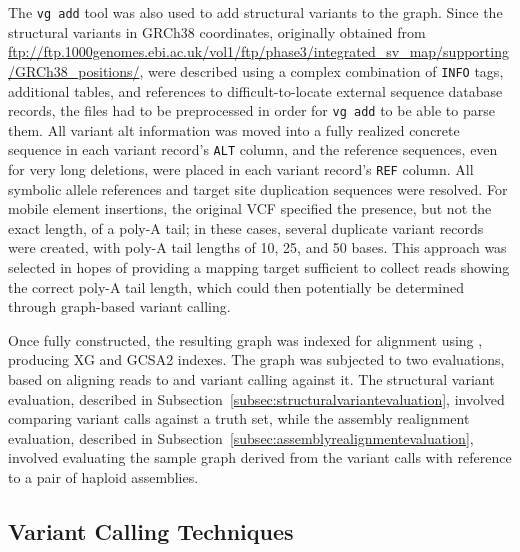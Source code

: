 \begin{sloppypar}
The \texttt{vg add} tool was also used to add structural variants to the graph. Since the structural variants in GRCh38 coordinates, originally obtained from \url{ftp://ftp.1000genomes.ebi.ac.uk/vol1/ftp/phase3/integrated_sv_map/supporting/GRCh38_positions/}, were described using a complex combination of \texttt{INFO} tags, additional tables, and references to difficult-to-locate external sequence database records, the files had to be preprocessed in order for \texttt{vg add} to be able to parse them. All variant alt information was moved into a fully realized concrete sequence in each variant record's \texttt{ALT} column, and the reference sequences, even for very long deletions, were placed in each variant record's \texttt{REF} column. All symbolic allele references and target site duplication sequences were resolved. For mobile element insertions, the original VCF specified the presence, but not the exact length, of a poly-A tail; in these cases, several duplicate variant records were created, with poly-A tail lengths of 10, 25, and 50 bases. This approach was selected in hopes of providing a mapping target sufficient to collect reads showing the correct poly-A tail length, which could then potentially be determined through graph-based variant calling.
\end{sloppypar}

Once fully constructed, the resulting graph was indexed for alignment using \vg, producing XG and GCSA2 indexes. The graph was subjected to two evaluations, based on aligning reads to and variant calling against it. The structural variant evaluation, described in Subsection~\ref{subsec:structuralvariantevaluation}, involved comparing variant calls against a truth set, while the assembly realignment evaluation, described in Subsection~\ref{subsec:assemblyrealignmentevaluation}, involved evaluating the sample graph derived from the variant calls with reference to a pair of haploid assemblies.

\subsection{Variant Calling Techniques}
\label{subsec:variantcalling}

